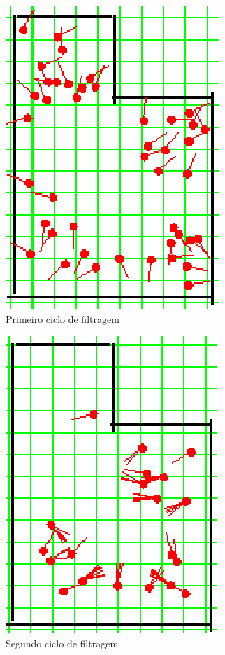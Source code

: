 \begin{figure}[H]
  \centering
  \includegraphics[scale=0.6]{figuras/cen1_ex1/2.eps}
  \caption[Primeiro Ciclo de Filtragem]{Primeiro ciclo de filtragem}
  \label{img:cen1_ex1_2}
\end{figure}

\begin{figure}[H]
  \centering
  \includegraphics[scale=0.6]{figuras/cen1_ex1/3.eps}
  \caption[Segundo Ciclo de Filtragem]{Segundo ciclo de filtragem}
  \label{img:cen1_ex1_3}
\end{figure}

